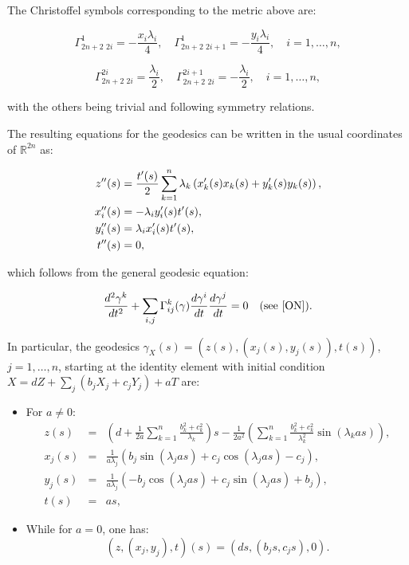 \documentclass[12pt]{amsart}
\theoremstyle{plain}
\theoremstyle{definition}
\theoremstyle{remark}
\begin{document}
The Christoffel symbols corresponding to the metric above are:

\[
\Gamma^1_{2n+2 \,\, 2i} = -\frac{x_i \lambda_i}{4}, \quad \Gamma^1_{2n+2 \,\, 2i+1} = -\frac{y_i \lambda_i}{4}, \quad i = 1, \ldots, n,
\]

\[
\Gamma^{2i}_{2n+2 \,\, 2i} = \frac{\lambda_i}{2}, \quad \Gamma^{2i+1}_{2n+2 \,\, 2i} = -\frac{\lambda_i}{2}, \quad i = 1, \ldots, n,
\]

with the others being trivial and following symmetry relations.

The resulting equations for the geodesics can be written in the usual coordinates of \( \mathbb{R}^{2n} \) as:

\begin{equation}\label{geodcomp}
\begin{aligned}
    z''(s) & = \frac{t'(s)}{2} \sum_{k=1}^{n} \lambda_k \left(x_k'(s) x_k(s) + y_k'(s) y_k(s)\right), \\ \vspace{.2cm}
    x_i''(s) & = -\lambda_i y_i'(s) t'(s), \\ \vspace{.2cm}
    y_i''(s) & = \lambda_i x_i'(s) t'(s), \\ \vspace{.2cm}
    t''(s) & = 0,
\end{aligned}
\end{equation}

which follows from the general geodesic equation:

\[
\frac{d^2 \gamma^k}{dt^2} + \sum_{i,j} \Gamma^k_{ij}(\gamma) \frac{d \gamma^i}{dt} \frac{d \gamma^j}{dt} = 0 \quad \text{(see \cite{ON})}.
\]

In particular, the geodesics \( \gamma_X(s) = (z(s), (x_j(s), y_j(s)), t(s)) \), \( j = 1, \ldots, n \), starting at the identity element with initial condition \( X = d Z + \sum_j (b_j X_j + c_j Y_j) + a T \) are:

\begin{itemize}
    \item For \( a \neq 0 \):
    \begin{eqnarray}\label{geo_osc_1}
        z(s) & = & \left(d + \frac{1}{2 a} \sum_{k=1}^{n} \frac{b_k^2 + c_k^2}{\lambda_k}\right)s - \frac{1}{2 a^2} \left(\sum_{k=1}^{n} \frac{b_k^2 + c_k^2}{\lambda_k^2} \sin(\lambda_k a s)\right), \\
        x_j(s) & = & \frac{1}{a \lambda_j} \left(b_j \sin(\lambda_j a s) + c_j \cos(\lambda_j a s) - c_j\right), \\
        y_j(s) & = & \frac{1}{a \lambda_j} \left(-b_j \cos(\lambda_j a s) + c_j \sin(\lambda_j a s) + b_j\right), \\
        t(s) & = & a s,
    \end{eqnarray}

    \item While for \( a = 0 \), one has:
    \begin{equation}\label{geo2}
        (z, (x_j, y_j), t)(s) = (ds, (b_j s, c_j s), 0).
    \end{equation}
\end{itemize}
\end{document}
